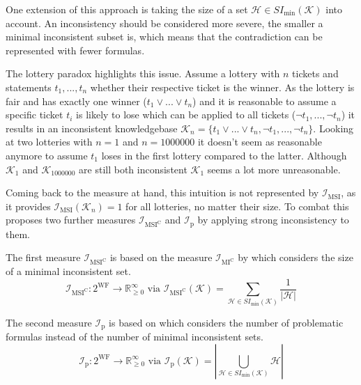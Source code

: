 One extension of this approach is taking the size of a set \(\mathcal{H} \in SI_{\min}(\mathcal{K})\) into account. An inconsistency should be considered more severe, the smaller a minimal inconsistent subset is, which means that the contradiction can be represented with fewer formulas.

The lottery paradox \cite{kyburg_probability_1961} highlights this issue.
Assume a lottery with \(n\) tickets and statements \(t_1, ..., t_n\) whether their respective ticket is the winner. As the lottery is fair and has exactly one winner (\(t_1 \lor ... \lor t_n\)) and it is reasonable to assume a specific ticket \(t_i\) is likely to lose which can be applied to all tickets (\(\neg t_1, ..., \neg t_n\)) it results in an inconsistent knowledgebase \(\mathcal{K}_n = \{ t_1 \lor ... \lor t_n, \neg t_1, ..., \neg t_n \}\). Looking at two lotteries with \(n = 1\) and \(n = 1000000\) it doesn't seem as reasonable anymore to assume \(t_1\) loses in the first lottery compared to the latter. Although \(\mathcal{K}_1\) and \(\mathcal{K}_{1000000}\) are still both inconsistent \(\mathcal{K}_1\) seems a lot more unreasonable.

Coming back to the measure at hand, this intuition is not represented by \(\mathcal{I}_{\text{MSI}}\), as it provides \(\mathcal{I}_{\text{MSI}}(\mathcal{K}_n) = 1\) for all lotteries, no matter their size. To combat this \cite{ulbricht_handling_2020} proposes two further measures \(\mathcal{I}_{\text{MSI}^\text{C}}\) and \(\mathcal{I}_{\text{p}}\) by applying strong inconsistency to them.

The first measure \(\mathcal{I}_{\text{MSI}^\text{C}}\) is based on the measure \(\mathcal{I}_{\text{MI}^{\text{C}}}\) by \cite{hunter_measuring_2008} which considers the size of a minimal inconsistent set.\\
\[\mathcal{I}_{\text{MSI}^\text{C}}: 2^{\text{WF}} \rightarrow \mathbb{R}_{\geq 0}^{\infty} \text{ via } \mathcal{I}_{\text{MSI}^\text{C}}(\mathcal{K}) = \sum_{\mathcal{H} \in SI_{\min}(\mathcal{K})} \frac{1}{|\mathcal{H}|}\]

The second measure \(\mathcal{I}_{\text{p}}\) is based on \cite{liu_measuring_2011} which considers the number of problematic formulas instead of the number of minimal inconsistent sets.\\
\[\mathcal{I}_{\text{p}}: 2^{\text{WF}} \rightarrow \mathbb{R}_{\geq 0}^{\infty} \text{ via } \mathcal{I}_{\text{p}}(\mathcal{K}) = \left| \bigcup_{\mathcal{H} \in SI_{\min}(\mathcal{K})} \mathcal{H} \right|\]

